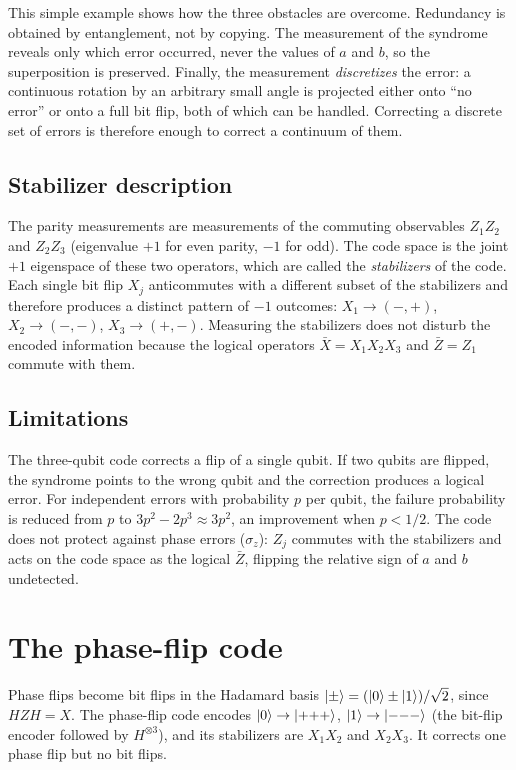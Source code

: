 This simple example shows how the three obstacles are overcome. Redundancy is obtained by entanglement, not by copying. The measurement of the syndrome reveals only which error occurred, never the values of $a$
and $b$, so the superposition is preserved. Finally, the measurement \emph{discretizes} the error: a continuous rotation by an arbitrary small angle is projected either onto ``no error'' or onto a full bit flip,
both of which can be handled. Correcting a discrete set of errors is therefore enough to correct a continuum of them.

\subsection{Stabilizer description}
The parity measurements are measurements of the commuting observables $Z_1Z_2$ and $Z_2Z_3$ (eigenvalue $+1$ for even parity, $-1$ for odd). The code space is the joint $+1$ eigenspace of these two operators,
which are called the \emph{stabilizers} of the code. Each single bit flip $X_j$ anticommutes with a different subset of the stabilizers and therefore produces a distinct pattern of $-1$ outcomes:
$X_1\to(-,+)$, $X_2\to(-,-)$, $X_3\to(+,-)$. Measuring the stabilizers does not disturb the encoded information because the logical operators $\bar X=X_1X_2X_3$ and $\bar Z=Z_1$ commute with them.

\subsection{Limitations}
The three-qubit code corrects a flip of a single qubit. If two qubits are flipped, the syndrome points to the wrong qubit and the correction produces a logical error. For independent errors with probability $p$ per qubit,
the failure probability is reduced from $p$ to $3p^2-2p^3\approx3p^2$, an improvement when $p<1/2$. The code does not protect against phase errors ($\sigma_z$): $Z_j$ commutes with the stabilizers and acts on the code
space as the logical $\bar Z$, flipping the relative sign of $a$ and $b$ undetected.

\section{The phase-flip code}
Phase flips become bit flips in the Hadamard basis $\left|\pm\right\rangle=(\left|0\right\rangle\pm\left|1\right\rangle)/\sqrt2$, since $HZH=X$. The phase-flip code encodes $\left|0\right\rangle\to\left|{+}{+}{+}\right\rangle$, $\left|1\right\rangle\to\left|{-}{-}{-}\right\rangle$ (the bit-flip encoder followed by $H^{\otimes3}$),
and its stabilizers are $X_1X_2$ and $X_2X_3$. It corrects one phase flip but no bit flips.

